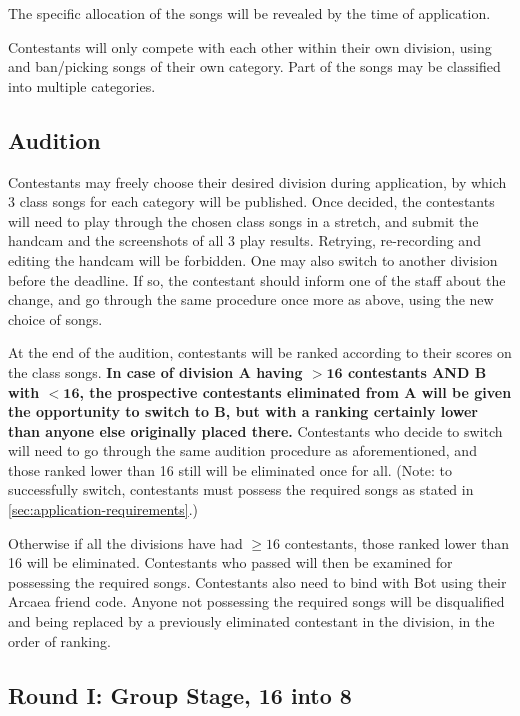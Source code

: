\documentclass{article}
\newcommand{\alert}[1]{{\color{red} #1}}
\begin{document}
\alert{
	The specific allocation of the songs  %
	will be revealed by the time of application.
}

Contestants will only compete with each other
within their own division,
using and ban/picking songs of their own category.
Part of the songs may be classified into multiple categories.

\subsection{Audition}

Contestants may freely choose their desired division
during application,
by which 3 class songs for each category will be published.
Once decided, the contestants will need to play through the chosen class songs in a stretch,
and submit the handcam and the screenshots of all 3 play results.
Retrying, re-recording and editing the handcam will be forbidden.  %
One may also switch to another division before the deadline.
If so, the contestant should inform one of the staff about the change,
and go through the same procedure once more as above,
using the new choice of songs.  %

At the end of the audition,
contestants will be ranked
according to their scores on the class songs.
\textbf{In case of division A having $\mathbf{> 16}$ contestants
	AND B with $\mathbf{< 16}$,
	the prospective contestants eliminated from A
	will be given the opportunity to switch to B,
	but with a ranking certainly lower than
	anyone else originally placed there.}
Contestants who decide to switch
will need to go through the same
audition procedure as aforementioned,
and those ranked lower than 16 still will be eliminated
once for all.  %
(Note: to successfully switch, contestants
must possess the required songs
as stated in \cref{sec:application-requirements}.)

Otherwise if all the divisions have had $\geq 16$ contestants,
those ranked lower than 16 will be eliminated.
Contestants who passed will then be examined for
possessing the required songs.
Contestants also need to bind with Bot
using their Arcaea friend code.
Anyone not possessing the required songs
will be disqualified and being
replaced by a previously eliminated
contestant in the division,
in the order of ranking.

\subsection{Round I: Group Stage, 16 into 8}
\end{document}
